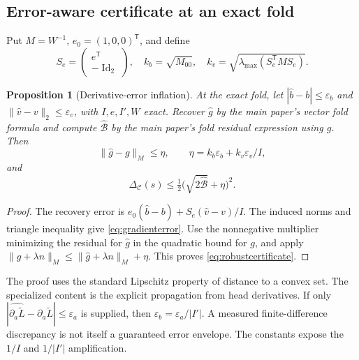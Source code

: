 \documentclass[10pt,a4paper]{article}
\newtheorem{proposition}[theorem]{Proposition}
\begin{document}
\subsection{Error-aware certificate at an exact fold}
Put $M=W^{-1}$, $e_0=(1,0,0)^{\mathsf T}$, and define
\begin{equation}
 S_e=\begin{pmatrix}e^{\mathsf T}\\-\operatorname{Id}_2\end{pmatrix},\quad
 k_b=\sqrt{M_{00}},\quad k_v=\sqrt{\lambda_{\max}(S_e^{\mathsf T}MS_e)}.
 \label{eq:errorconstants}
\end{equation}
\begin{proposition}[Derivative-error inflation]
\label{prop:robust}
At the exact fold, let $|\widehat b-b|\leq\varepsilon_b$ and $\|\widehat v-v\|_2\leq\varepsilon_v$, with $I,e,I',W$ exact. Recover $\widehat g$ by the main paper's vector fold formula and compute $\widehat{\mathcal B}$ by the main paper's fold residual expression using $\widehat g$. Then
\begin{equation}
 \|\widehat g-g\|_M\leq\eta,
 \qquad\eta=k_b\varepsilon_b+k_v\varepsilon_v/I,
 \label{eq:gradienterror}
\end{equation}
and
\begin{equation}
 \Delta_{\mathcal C}(s)\leq
 \tfrac12\bigl(\sqrt{2\widehat{\mathcal B}}+\eta\bigr)^2.
 \label{eq:robustcertificate}
\end{equation}
\end{proposition}
\begin{proof}
The recovery error is $e_0(\widehat b-b)+S_e(\widehat v-v)/I$. The induced norms and triangle inequality give \eqref{eq:gradienterror}. Use the nonnegative multiplier minimizing the residual for $\widehat g$ in the quadratic bound for $g$, and apply $\|g+\lambda n\|_M\leq\|\widehat g+\lambda n\|_M+\eta$. This proves \eqref{eq:robustcertificate}.
\end{proof}
The proof uses the standard Lipschitz property of distance to a convex set. The specialized content is the explicit propagation from head derivatives. If only $|\widehat{\partial_a\widetilde L}-\partial_a\widetilde L|\leq\varepsilon_a$ is supplied, then $\varepsilon_b=\varepsilon_a/|I'|$. A measured finite-difference discrepancy is not itself a guaranteed error envelope. The constants expose the $1/I$ and $1/|I'|$ amplification.
\end{document}
